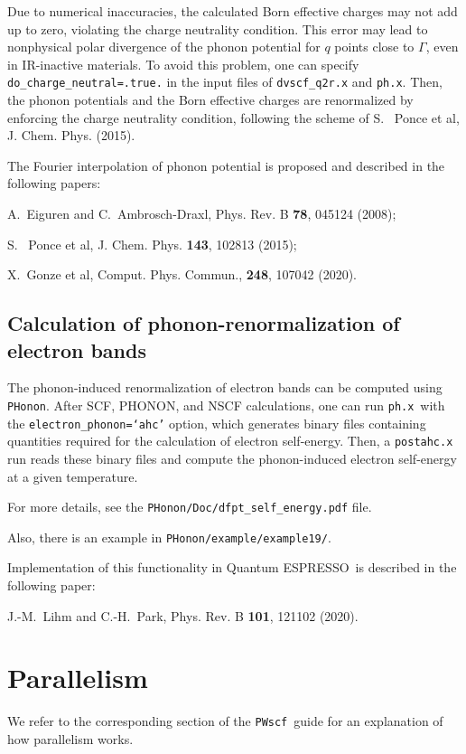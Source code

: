 \documentclass[12pt,a4paper]{article}
\def\qe{{\sc Quantum ESPRESSO}}
\def\phx{\texttt{ph.x}}
\def\PWscf{\texttt{PWscf}}
\def\PHonon{\texttt{PHonon}}
\begin{document}
Due to numerical inaccuracies, the calculated Born effective charges may not
add up to zero, violating the charge neutrality condition. This error may lead
to nonphysical polar divergence of the phonon potential for $q$ points close
to $\Gamma$, even in IR-inactive materials. To avoid this problem, one can
specify \texttt{do\_charge\_neutral=.true.} in the input files of
\texttt{dvscf\_q2r.x} and \phx. Then, the phonon potentials and the Born
effective charges are renormalized by enforcing the charge neutrality condition,
following the scheme of S.~ Ponce et al, J. Chem. Phys. (2015).

The Fourier interpolation of phonon potential is proposed and described in the
following papers:

A.~Eiguren and C.~Ambrosch-Draxl, Phys. Rev. B {\bf 78}, 045124 (2008);

S.~ Ponce et al, J. Chem. Phys. {\bf 143}, 102813 (2015);

X.~Gonze et al, Comput. Phys. Commun., {\bf 248}, 107042 (2020).

\subsection{Calculation of phonon-renormalization of electron bands}
The phonon-induced renormalization of electron bands can be computed using \PHonon.
After SCF, PHONON, and NSCF calculations, one can run \phx\ with the
\texttt{electron\_phonon=`ahc'} option, which generates binary files containing
quantities required for the calculation of electron self-energy.
Then, a \texttt{postahc.x} run reads these binary files and compute the
phonon-induced electron self-energy at a given temperature.

For more details, see the \verb|PHonon/Doc/dfpt_self_energy.pdf| file.

Also, there is an example in \verb|PHonon/example/example19/|.

Implementation of this functionality in \qe\ is described in the following
paper:

J.-M.~Lihm and C.-H.~Park, Phys. Rev. B {\bf 101}, 121102 (2020).


\section{Parallelism}
\label{Sec:para}

We refer to the corresponding section of the \PWscf\ guide for
an explanation of how parallelism works. 
\end{document}
